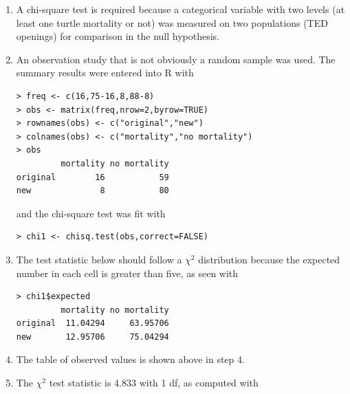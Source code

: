 \documentclass[10pt,openany]{book}\usepackage[]{graphicx}\usepackage[]{color}
\makeatletter
\newenvironment{kframe}{%
 \def\at@end@of@kframe{}%
 \ifinner\ifhmode%
  \def\at@end@of@kframe{\end{minipage}}%
  \begin{minipage}{\columnwidth}%
 \fi\fi%
 \def\FrameCommand##1{\hskip\@totalleftmargin \hskip-\fboxsep
 \colorbox{shadecolor}{##1}\hskip-\fboxsep
     \hskip-\linewidth \hskip-\@totalleftmargin \hskip\columnwidth}%
 \MakeFramed {\advance\hsize-\width
   \@totalleftmargin\z@ \linewidth\hsize
   \@setminipage}}%
 {\par\unskip\endMakeFramed%
 \at@end@of@kframe}
\newenvironment{knitrout}{}{} %
\makeatother
\begin{document}
\begin{itemize}
\begin{enumerate}
      \item A chi-square test is required because a categorical variable with two levels (at least one turtle mortality or not) was measured on two populations (TED openings) for comparison in the null hypothesis.
      \item An observation study that is not obviously a random sample was used.  The summary results were entered into R with
\begin{knitrout}
\color{fgcolor}\begin{kframe}
\begin{verbatim}
> freq <- c(16,75-16,8,88-8)
> obs <- matrix(freq,nrow=2,byrow=TRUE)
> rownames(obs) <- c("original","new")
> colnames(obs) <- c("mortality","no mortality")
> obs
         mortality no mortality
original        16           59
new              8           80
\end{verbatim}
\end{kframe}
\end{knitrout}
and the chi-square test was fit with
\begin{knitrout}
\color{fgcolor}\begin{kframe}
\begin{verbatim}
> chi1 <- chisq.test(obs,correct=FALSE)
\end{verbatim}
\end{kframe}
\end{knitrout}
      \item The test statistic below should follow a $\chi^{2}$ distribution because the expected number in each cell is greater than five, as seen with
\begin{knitrout}
\color{fgcolor}\begin{kframe}
\begin{verbatim}
> chi1$expected
         mortality no mortality
original  11.04294     63.95706
new       12.95706     75.04294
\end{verbatim}
\end{kframe}
\end{knitrout}
      \item The table of observed values is shown above in step 4.
      \item The $\chi^{2}$ test statistic is 4.833 with 1 df, as computed with
\begin{knitrout}
\color{fgcolor}\begin{kframe}

\end{kframe}
\end{knitrout}
\end{enumerate}
\end{itemize}
\end{document}
